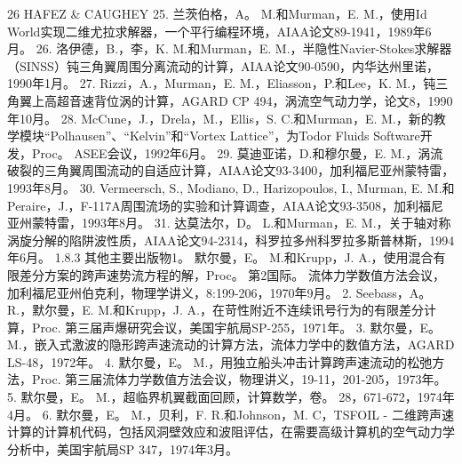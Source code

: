 \documentclass[UTF8,11pt,a4paper,openany,fontset=fandol]{ctexbook}
\begin{document}
26 HAFEZ \& CAUGHEY 25. 兰茨伯格，A。 M.和Murman，E. M.，使用Id World实现二维尤拉求解器，一个平行编程环境，AIAA论文89-1941，1989年6月。 26. 洛伊德，B.，李，K. M.和Murman，E. M.，半隐性Navier-Stokes求解器（SINSS）钝三角翼周围分离流动的计算，AIAA论文90-0590，内华达州里诺，1990年1月。 27. Rizzi，A.，Murman，E. M.，Eliasson，P.和Lee，K. M.，钝三角翼上高超音速背位涡的计算，AGARD CP 494，涡流空气动力学，论文8，1990年10月。 28. McCune，J.，Drela，M.，Ellis，S. C.和Murman，E. M.，新的教学模块“Polhausen”、“Kelvin”和“Vortex Lattice”，为Todor Fluids Software开发，Proc。 ASEE会议，1992年6月。 29. 莫迪亚诺，D.和穆尔曼，E. M.，涡流破裂的三角翼周围流动的自适应计算，AIAA论文93-3400，加利福尼亚州蒙特雷，1993年8月。 30. Vermeersch, S., Modiano, D., Harizopoulos, I., Murman, E. M.和Peraire，J.，F-117A周围流场的实验和计算调查，AIAA论文93-3508，加利福尼亚州蒙特雷，1993年8月。 31. 达莫法尔，D。 L.和Murman，E. M.，关于轴对称涡旋分解的陷阱波性质，AIAA论文94-2314，科罗拉多州科罗拉多斯普林斯，1994年6月。 1.8.3 其他主要出版物1。 默尔曼，E。 M.和Krupp，J. A.，使用混合有限差分方案的跨声速势流方程的解，Proc。 第2国际。 流体力学数值方法会议，加利福尼亚州伯克利，物理学讲义，8:199-206，1970年9月。 2. Seebass，A。 R.，默尔曼，E. M.和Krupp，J. A.，在苛性附近不连续讯号行为的有限差分计算，Proc. 第三届声爆研究会议，美国宇航局SP-255，1971年。 3. 默尔曼，E。 M.，嵌入式激波的隐形跨声速流动的计算方法，流体力学中的数值方法，AGARD LS-48，1972年。 4. 默尔曼，E。 M.，用独立船头冲击计算跨声速流动的松弛方法，Proc. 第三届流体力学数值方法会议，物理讲义，19-11，201-205，1973年。 5. 默尔曼，E。 M.，超临界机翼截面回顾，计算数学，卷。 28，671-672，1974年4月。 6. 默尔曼，E。 M.，贝利，F. R.和Johnson，M. C，TSFOIL - 二维跨声速计算的计算机代码，包括风洞壁效应和波阻评估，在需要高级计算机的空气动力学分析中，美国宇航局SP 347，1974年3月。
\end{document}
